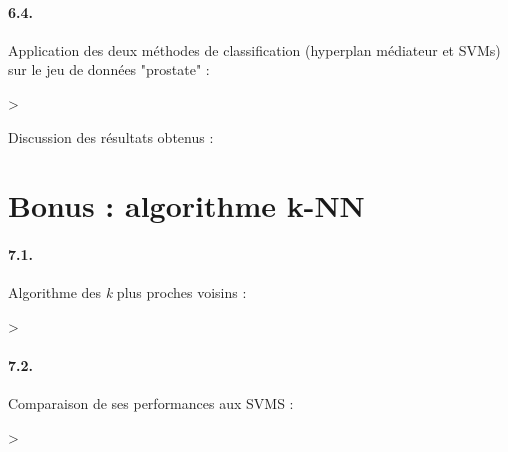 \documentclass{article}
\begin{document}
\paragraph{6.4.}Application des deux méthodes de classification 
(hyperplan médiateur et SVMs) sur le jeu de données "prostate" :
\begin{Schunk}
\end{Schunk}
\begin{Schunk}
\begin{Sinput}
> 
\end{Sinput}
\end{Schunk}
\newline
Discussion des résultats obtenus :

\section{Bonus : algorithme k-NN}
\paragraph{7.1.}Algorithme des \textit{k} plus proches voisins :
\begin{Schunk}
\begin{Sinput}
> 
\end{Sinput}
\end{Schunk}
\paragraph{7.2.}Comparaison de ses performances aux SVMS :
\begin{Schunk}
\begin{Sinput}
> 
\end{Sinput}
\end{Schunk}
\end{document}
